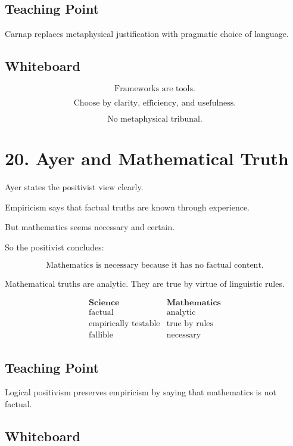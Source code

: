 \documentclass[11pt]{article}
\begin{document}
\subsection*{Teaching Point}

Carnap replaces metaphysical justification with pragmatic choice of language.

\subsection*{Whiteboard}

\[
\text{Frameworks are tools.}
\]

\[
\text{Choose by clarity, efficiency, and usefulness.}
\]

\[
\text{No metaphysical tribunal.}
\]

\section*{20. Ayer and Mathematical Truth}

Ayer states the positivist view clearly.

Empiricism says that factual truths are known through experience.

But mathematics seems necessary and certain.

So the positivist concludes:

\[
\boxed{
\text{Mathematics is necessary because it has no factual content.}
}
\]

Mathematical truths are analytic. They are true by virtue of linguistic rules.

\[
\begin{array}{c|c}
\textbf{Science} & \textbf{Mathematics} \\
\hline
\text{factual} & \text{analytic} \\
\text{empirically testable} & \text{true by rules} \\
\text{fallible} & \text{necessary}
\end{array}
\]

\subsection*{Teaching Point}

Logical positivism preserves empiricism by saying that mathematics is not factual.

\subsection*{Whiteboard}
\end{document}
